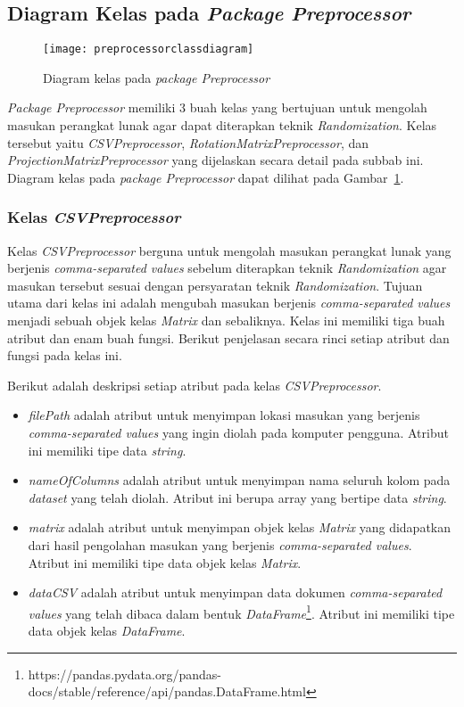 \subsection{Diagram Kelas pada \textit{Package Preprocessor}}
\label{subsec:diagram-kelas-preprocessor}

\begin{figure}
	\centering
	\texttt{[image: preprocessorclassdiagram]}
	\caption{Diagram kelas pada \textit{package Preprocessor}}
	\label{fig:preprocessorclassdiagram}
\end{figure}

\textit{Package Preprocessor} memiliki 3 buah kelas yang bertujuan untuk mengolah masukan perangkat lunak agar dapat diterapkan teknik \textit{Randomization}. Kelas tersebut yaitu \textit{CSVPreprocessor}, \textit{RotationMatrixPreprocessor}, dan \textit{ProjectionMatrixPreprocessor} yang dijelaskan secara detail pada subbab ini. Diagram kelas pada \textit{package Preprocessor} dapat dilihat pada Gambar~\ref{fig:preprocessorclassdiagram}.

\subsubsection{Kelas \textit{CSVPreprocessor}}
\label{subsubsec:kelas-csvpreprocessor}

Kelas \textit{CSVPreprocessor} berguna untuk mengolah masukan perangkat lunak yang berjenis \textit{comma-separated values} sebelum diterapkan teknik \textit{Randomization} agar masukan tersebut sesuai dengan persyaratan teknik \textit{Randomization}. Tujuan utama dari kelas ini adalah mengubah masukan berjenis \textit{comma-separated values} menjadi sebuah objek kelas \textit{Matrix} dan sebaliknya. Kelas ini memiliki tiga buah atribut dan enam buah fungsi. Berikut penjelasan secara rinci setiap atribut dan fungsi pada kelas ini.

Berikut adalah deskripsi setiap atribut pada kelas \textit{CSVPreprocessor}.
\begin{itemize}
	\item \textit{filePath} adalah atribut untuk menyimpan lokasi masukan yang berjenis \textit{comma-separated values} yang ingin diolah pada komputer pengguna. Atribut ini memiliki tipe data \textit{string}.
	\item \textit{nameOfColumns} adalah atribut untuk menyimpan nama seluruh kolom pada \textit{dataset} yang telah diolah. Atribut ini berupa array yang bertipe data \textit{string}.
	\item \textit{matrix} adalah atribut untuk menyimpan objek kelas \textit{Matrix} yang didapatkan dari hasil pengolahan masukan yang berjenis \textit{comma-separated values}. Atribut ini memiliki tipe data objek kelas \textit{Matrix}.
	\item \textit{dataCSV} adalah atribut untuk menyimpan data dokumen \textit{comma-separated values} yang telah dibaca dalam bentuk \textit{DataFrame}\footnote{https://pandas.pydata.org/pandas-docs/stable/reference/api/pandas.DataFrame.html}. Atribut ini memiliki tipe data objek kelas \textit{DataFrame}.
\end{itemize}

